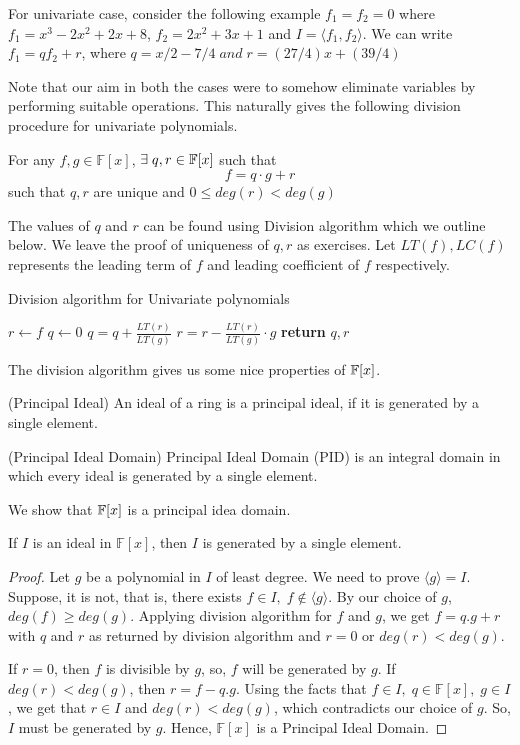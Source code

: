 \begin{example}
For univariate case, consider the following example $f_1 = f_2 = 0$ where
$f_1 = x^3-2x^2+2x+8$, $f_2 = 2x^2+3x+1$ and $I=\langle f_1,f_2\rangle $. 
We can write $f_1 = qf_2+r$, where $q=x/2 - 7/4\;and \; r=(27/4)x+(39/4)$
\end{example}
Note that our aim in both the cases were to somehow eliminate variables by
performing suitable operations. This naturally gives the following division
procedure for univariate polynomials.

\begin{lemma}[Division]
	For any $f,g \in \mathbb{F}[x]$, $\exists\;q,r \in {\mathbb{F}}[x]$ such 
	that $$ f=q \cdot g+r $$ such that $q,r$ are unique and 
	$0 \le deg(r) < deg(g)$
\end{lemma}
The values of $q$ and $r$ can be found using Division algorithm which we
outline below. We leave the proof of uniqueness of $q,r$ as exercises.
Let $LT(f),LC(f)$ represents the leading term of $f$ and leading coefficient 
of $f$ respectively. 
\begin{algorithm}[htp!]
\caption{Division algorithm for Univariate polynomials}\label{euclid}
\begin{algorithmic}[1]
\State $r \leftarrow f$
\State $q \leftarrow 0$
\State $q = q + \frac{LT(r)}{LT(g)}$
\State $r=r-\frac{LT(r)}{LT(g)}\cdot g$
\EndWhile
\State \textbf{return} $q,r$
\EndProcedure
\end{algorithmic}
\end{algorithm}
The division algorithm gives us some nice properties of ${\mathbb{F}}[x]$. 

\begin{definition}(Principal Ideal)
An ideal of a ring is a principal ideal, if it is generated by a single element.
\end{definition}
\begin{definition}(Principal Ideal Domain)
Principal Ideal Domain (PID) is an integral domain in which every ideal is generated by a single element.
\end{definition}
We show that ${\mathbb{F}}[x]$ is a principal idea domain.
\begin{theorem}
If $I$ is an ideal in $\mathbb{F}[x]$, then $I$ is generated by a single element.
\end{theorem}
\begin{proof} 
	Let $g$ be a polynomial in $I$ of least degree. We need to prove
	$\langle g\rangle =I$. Suppose, it is not, that is, there exists $f \in
	I,\; f \notin \langle g\rangle$.  By our choice  of $g$,
	$deg(f)\geq deg(g)$. Applying division algorithm for $f$ and $g$, we
	get $f=q.g+r$ with $q$ and $r$ as returned by division algorithm 
	and $r=0$ or $deg(r)<deg(g)$.
	
	If $r=0$, then $f$ is divisible by $g$, so, $f$ will be generated by
	$g$. If $deg(r)<deg(g)$, then $r = f-q.g$. Using the facts that $ f\in
	I,\;q\in\mathbb{F}[x],\;g\in I$, we get that $r\in I$ and
	$deg(r)<deg(g)$, which contradicts our choice of $g$. So, $I$ must
	be generated by $g$. Hence, $\mathbb{F}[x]$ is a Principal Ideal Domain.
\end{proof}

